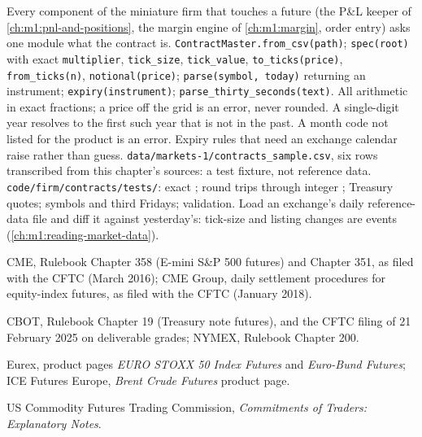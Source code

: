 \begin{build}
 Every component of the miniature firm that touches a
future (the P\&L keeper of \cref{ch:m1:pnl-and-positions}, the margin engine
of \cref{ch:m1:margin}, order entry) asks one module what the contract is.
 \texttt{ContractMaster.from\_csv(path)};
\texttt{spec(root)} with exact \texttt{multiplier}, \texttt{tick\_size},
\texttt{tick\_value}, \texttt{to\_ticks(price)}, \texttt{from\_ticks(n)},
\texttt{notional(price)}; \texttt{parse(symbol, today)} returning an
instrument; \texttt{expiry(instrument)};
\texttt{parse\_thirty\_seconds(text)}.
 All arithmetic in exact fractions; a price off the  grid
is an error, never rounded. A single-digit year resolves to the first such
year that is not in the past. A month code not listed for the product is an
error. Expiry rules that need an exchange calendar raise rather than guess.
 \texttt{data/markets-1/contracts\_sample.csv}, six rows
transcribed from this chapter's sources: a test fixture, not reference data.
 \texttt{code/firm/contracts/tests/}: exact ; round trips through integer ; Treasury quotes; symbols and
third Fridays; validation.
 Load an exchange's daily reference-data file and diff it
against yesterday's: tick-size and listing changes are events
(\cref{ch:m1:reading-market-data}).
\end{build}

\begin{omsources}
\item CME, Rulebook Chapter 358 (E-mini S\&P 500 futures) and Chapter 351,
as filed with the CFTC (March 2016); CME Group, daily settlement procedures
for equity-index futures, as filed with the CFTC (January 2018).
\item CBOT, Rulebook Chapter 19 (Treasury note futures), and the CFTC filing
of 21 February 2025 on deliverable grades; NYMEX, Rulebook Chapter 200.
\item Eurex, product pages \emph{EURO STOXX 50 Index Futures} and
\emph{Euro-Bund Futures}; ICE Futures Europe, \emph{Brent Crude Futures}
product page.
\item US Commodity Futures Trading Commission, \emph{Commitments of Traders:
Explanatory Notes}.
\end{omsources}


